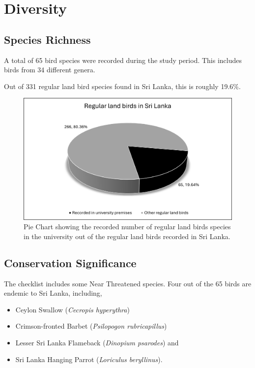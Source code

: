 \chapter{Diversity}
\label{cp:Diversity}

\section{Species Richness}
A total of 65 bird species were recorded during the study period. This includes birds from 34 different genera. 

Out of 331 regular land bird species found in Sri Lanka, this is roughly 19.6\%.

\begin{figure}[!htpb]
    \centering
    \includegraphics[width=\linewidth]{Figures/pieChart1.png}
    \caption[]{Pie Chart showing the recorded number of regular land birds species in the university out of the regular land birds recorded in Sri Lanka.}
    \label{fig:figure-01}
\end{figure}


\section{Conservation Significance}
The checklist includes some Near Threatened species. Four out of the 65 birds are endemic to Sri Lanka, including,
\begin{itemize}
    \item Ceylon Swallow (\textit{Cecropis hyperythra})
\item Crimson-fronted Barbet (\textit{Psilopogon rubricapillus})
\item Lesser Sri Lanka Flameback (\textit{Dinopium psarodes}) and
 \item Sri Lanka Hanging Parrot (\textit{Loriculus beryllinus}).
\end{itemize}

